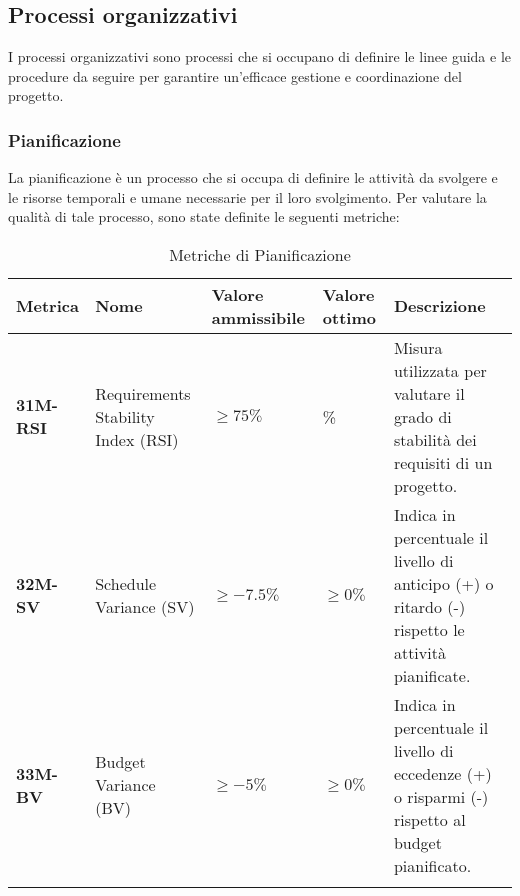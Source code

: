 \subsection{Processi organizzativi}
I processi organizzativi sono processi che si occupano di definire le linee guida e le procedure da seguire per garantire
un'efficace gestione e coordinazione del progetto.

\subsubsection{Pianificazione}
La pianificazione è un processo che si occupa di definire le attività da svolgere e le risorse temporali e umane necessarie
per il loro svolgimento. Per valutare la qualità di tale processo, sono state definite le seguenti metriche:
\begin{longtable}{|>{\raggedright\arraybackslash}m{}|>{\raggedright\arraybackslash}m{}|>{\raggedright\arraybackslash}m{}|>{\raggedright\arraybackslash}m{}|>{\raggedright\arraybackslash}m{}|}
	\hline
	\textbf{Metrica} & \textbf{Nome} & \textbf{Valore ammissibile} & \textbf{Valore ottimo} & \textbf{Descrizione}\\
	\hline
	\endfirsthead
	\hline
	\textbf{31M-RSI} & Requirements Stability Index (RSI) & $\geq 75\% $ & 100\% & Misura utilizzata per valutare il grado di stabilità dei requisiti di un progetto.\\
	\hline
	\textbf{32M-SV} & Schedule Variance (SV) & $\geq -7.5\%$ & $\geq 0\%$ & Indica in percentuale il livello di anticipo (+) o ritardo (-) rispetto le attività pianificate.\\
	\hline
	\textbf{33M-BV} & Budget Variance (BV) & $\geq -5\%$ & $\geq 0\%$ & Indica in percentuale il livello di eccedenze (+) o risparmi (-) rispetto al budget pianificato.\\
	\hline
	\caption{Metriche di Pianificazione}
	\label{table:11}
\end{longtable}
